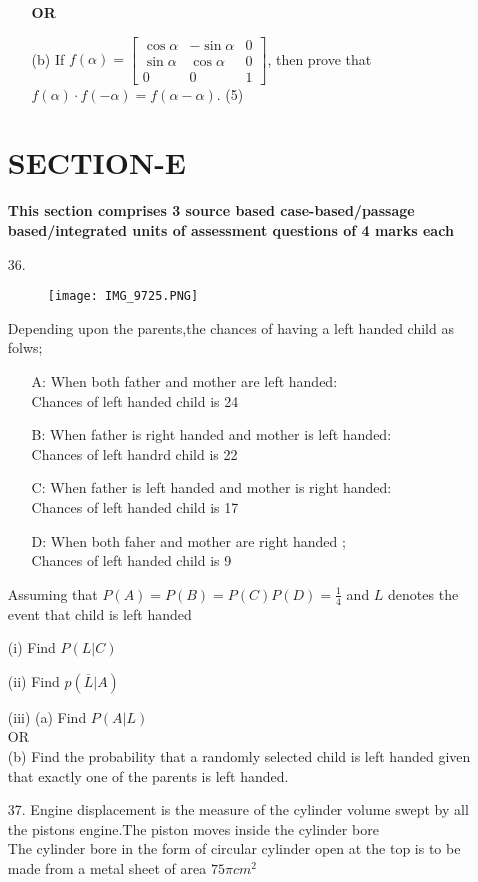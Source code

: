 \documentclass{article}
\begin{document}
\begin{enumerate}
\begin{enumerate}
\textbf{OR}

(b) If $f(\alpha) = \begin{bmatrix} \cos \alpha & -\sin \alpha &  0 \\ \sin \alpha & \cos \alpha & 0 \\ 0 & 0 & 1 \end{bmatrix}$, then prove that $f(\alpha) \cdot f(-\alpha) = f(\alpha - \alpha)$. \hfill (5)
\end{enumerate}
\section {SECTION-E}
\textbf{This section comprises 3 source based case-based/passage based/integrated units of assessment questions of 4 marks each}
\item[36.]
	\begin{figure}
		\texttt{[image: IMG\_9725.PNG]}
	\end{figure}
Depending upon the parents,the chances of having a left handed child as folws;
\begin{itemize}
\item [A:] When both father and mother are left handed:\\
Chances of left handed child is 24%
\item [B:] When father is right handed and mother is left handed:\\
Chances of left handrd child is 22%
\item [C:] When father is left handed and mother is right handed:\\
Chances of left handed child is 17%
\item [D:] When both faher and mother are right handed ;\\
Chances of left handed child is 9%
\end{itemize}
Assuming that $P(A) = P(B) = P(C) P(D) =\frac{1}{4}$ and \(L\) denotes the event that child is left handed\\
\item [(i)] Find \(P(L|C)\)
\item [(ii)] Find \(p(\overline{L}|A)\)
\item [(iii)](a) Find \(P(A|L)\)\\
OR\\
(b) Find the probability that a randomly selected child is left handed given that exactly one of the parents is left handed.
\item [37.] Engine displacement is the measure of the cylinder volume swept by all the pistons engine.The piston moves inside the cylinder bore \\
The cylinder bore in the form of circular cylinder open at the top is to be made from a metal sheet of area $75\pi cm^2$\\
\vspace{1em} %


\end{enumerate}
\end{document}
